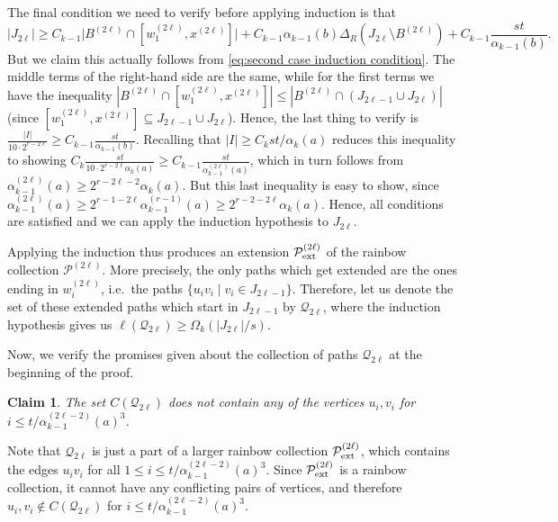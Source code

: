 \documentclass[a4paper,11pt]{article}
\makeatletter
\renewenvironment{proof}[1][\proofname] {\par\pushQED{\qed}\normalfont\topsep6\p@\@plus6\p@\relax\trivlist\item[\hskip\labelsep\bfseries#1\@addpunct{.}]\ignorespaces}{\popQED\endtrivlist\@endpefalse}
\newtheorem{claim}[theorem]{\bf Claim}
\theoremstyle{definition}
\def\cP{\mathcal{P}}
\def\cQ{\mathcal{Q}}
\makeatother
\begin{document}
\begin{proof}
The final condition we need to verify before applying induction is that 
\[|J_{2\ell}|\geq C_{k-1}\Big|B^{(2\ell)}\cap [w_1^{(2\ell)},x^{(2\ell)}]\Big| +C_{k-1} \alpha_{k-1}(b)\Delta_R(J_{2\ell} \setminus B^{(2\ell)})+C_{k-1}\frac{st}{ \alpha_{k-1}(b)}.\]
But we claim this actually follows from \eqref{eq:second case induction condition}. The middle terms of the right-hand side are the same, while for the first terms we have the inequality $|B^{(2\ell)}\cap [w_1^{(2\ell)},x^{(2\ell)}]|\leq |B^{(2\ell)}\cap (J_{2\ell-1}\cup J_{2\ell})|$ (since $[w_1^{(2\ell)},x^{(2\ell)}]\subseteq J_{2\ell-1}\cup J_{2\ell}$). 
Hence, the last thing to verify is $\frac{|I|}{10\cdot 2^{r-2\ell}}\geq C_{k-1}\frac{st}{\alpha_{k-1}(b)}$.
Recalling that $|I|\geq C_k st/\alpha_k(a)$ reduces this inequality to showing $C_k\frac{st}{10\cdot 2^{r-2\ell}\alpha_k(a)}\geq C_{k-1}\frac{st}{\alpha_{k-1}^{(2\ell)}(a)}$, which in turn follows from $\alpha_{k-1}^{(2\ell)}(a)\geq 2^{r-2\ell-2} \alpha_k(a)$. But this last inequality is easy to show, since $\alpha_{k-1}^{(2\ell)}(a)\geq 2^{r-1-2\ell} \alpha_{k-1}^{(r-1)}(a)\geq 2^{r-2-2\ell} \alpha_{k}(a)$. Hence, all conditions are satisfied and we can apply the induction hypothesis to $J_{2\ell}$. 

Applying the induction thus produces an extension $\cP^{(2\ell)}_{\rm ext}$ of the rainbow collection $\cP^{(2\ell)}$. More precisely, the only paths which get extended are the ones ending in $w_i^{(2\ell)}$, i.e.\ the paths $\{u_iv_i\mid v_i\in J_{2\ell-1}\}$. Therefore, let us denote the set of these extended paths which start in $J_{2\ell-1}$ by $\cQ_{2\ell}$, where the induction hypothesis gives us $\ell(\cQ_{2\ell})\geq \Omega_k(|J_{2\ell}|/s)$. 

Now, we verify the promises given about the collection of paths $\cQ_{2\ell}$ at the beginning of the proof.

\begin{claim}
The set $C(\cQ_{2\ell})$ does not contain any of the vertices $u_i, v_i$ for $i\leq t/\alpha_{k-1}^{(2\ell-2)}(a)^3$. 
\end{claim}
\begin{proof}
Note that $\cQ_{2\ell}$ is just a part of a larger rainbow collection $\cP^{(2\ell)}_{\rm ext}$, which contains the edges $u_iv_i$ for all $1\leq i\leq t/\alpha_{k-1}^{(2\ell-2)}(a)^3$. Since $\cP^{(2\ell)}_{\rm ext}$ is a rainbow collection, it cannot have any conflicting pairs of vertices, and therefore $u_i, v_i\notin C(\cQ_{2\ell})$ for $i\leq t/\alpha_{k-1}^{(2\ell-2)}(a)^3$.
\end{proof}


\end{proof}
\end{document}
